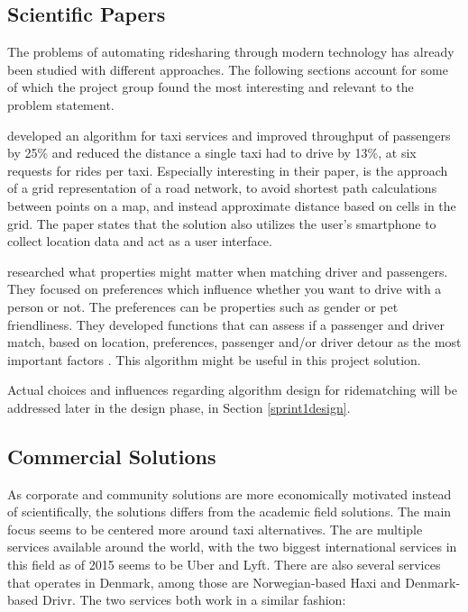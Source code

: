 \subsection{Scientific Papers}
The problems of automating ridesharing through modern technology has already been studied with different approaches.
The following sections account for some of which the project group found the most interesting and relevant to the problem statement. 


\citet{ShuoMa2013} developed an algorithm for taxi services and improved throughput of passengers by 25\% and reduced the distance a single taxi had to drive by 13\%, at six requests for rides per taxi.
Especially interesting in their paper, is the approach of a grid representation of a road network, to avoid shortest path calculations between points on a map, and instead approximate distance based on cells in the grid.
The paper states that the solution also utilizes the user's smartphone to collect location data and act as a user interface.

\citet{ghoseiri2011real} researched what properties might matter when matching driver and passengers.
They focused on preferences which influence whether you want to drive with a person or not.
The preferences can be properties such as gender or pet friendliness.
They developed functions that can assess if a passenger and driver match, based on location, preferences, passenger and/or driver detour as the most important factors \cite{ghoseiri2011real}.
This algorithm might be useful in this project solution.

Actual choices and influences regarding algorithm design for ridematching will be addressed later in the design phase, in Section \ref{sprint1design}.

\subsection{Commercial Solutions}
As corporate and community solutions are more economically motivated instead of scientifically, the solutions differs from the academic field solutions.
The main focus seems to be centered more around taxi alternatives.
The are multiple services available around the world, with the two biggest international services in this field as of 2015 seems to be Uber and Lyft\cite{ridehail}.
There are also several services that operates in Denmark, among those are Norwegian-based Haxi and Denmark-based Drivr.
The two services both work in a similar fashion: 

